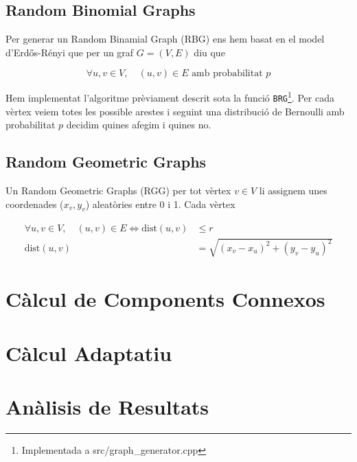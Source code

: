 \subsection{Random Binomial Graphs}
Per generar un Random Binamial Graph (RBG) ens hem basat en el model d'Erdős-Rényi \cite{Erdos1960OnGraphs,Erdos1959OnI} que per un graf $G=(V,E)$ diu que

\begin{equation}
    \forall u,v \in V,\quad (u,v) \in E \text{ amb probabilitat } p
\end{equation}

Hem implementat l'algoritme prèviament descrit sota la funció \texttt{BRG}\footnote{Implementada a src/graph\_generator.cpp}. Per cada vèrtex veiem totes les possible arestes i seguint una distribució de Bernoulli amb probabilitat $p$ decidim quines afegim i quines no.

\subsection{Random Geometric Graphs}
Un Random Geometric Graphs (RGG)\cite{Diaz2007On} per tot vèrtex $v \in V$ li assignem unes coordenades ($x_v, y_v$) aleatòries entre 0 i 1. Cada vèrtex 

\begin{align}
    \forall u,v \in V,\quad (u,v) \in E \Longleftrightarrow \text{dist}(u,v) &\leq r \\
    \text{dist}(u,v) &= \sqrt{\left(x_v - x_u\right)^2 + \left(y_v - y_u\right)^2}
\end{align}

\section{Càlcul de Components Connexos}

\section{Càlcul Adaptatiu}

\section{Anàlisis de Resultats}

